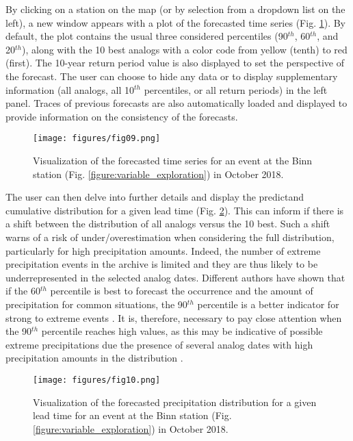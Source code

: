 \documentclass[review]{elsarticle}
\begin{document}
By clicking on a station on the map (or by selection from a dropdown list on the left), a new window appears with a plot of the forecasted time series (Fig. \ref{figure:atmoswing-viewer-timeseries}). By default, the plot contains the usual three considered percentiles (90$^{th}$, 60$^{th}$, and 20$^{th}$), along with the 10 best analogs with a color code from yellow (tenth) to red (first). The 10-year return period value is also displayed to set the perspective of the forecast. The user can choose to hide any data or to display supplementary information (all analogs, all 10$^{th}$ percentiles, or all return periods) in the left panel. Traces of previous forecasts are also automatically loaded and displayed to provide information on the consistency of the forecasts. 

\begin{figure}[hbt!]
	\texttt{[image: figures/fig09.png]}
	\caption{Visualization of the forecasted time series for an event at the Binn station (Fig. \ref{figure:variable_exploration}) in October 2018.}
	\label{figure:atmoswing-viewer-timeseries}
\end{figure}

The user can then delve into further details and display the predictand cumulative distribution for a given lead time (Fig. \ref{figure:atmoswing-viewer-distribution}). This can inform if there is a shift between the distribution of all analogs versus the 10 best. Such a shift warns of a risk of under/overestimation when considering the full distribution, particularly for high precipitation amounts. Indeed, the number of extreme precipitation events in the archive is limited and they are thus likely to be underrepresented in the selected analog dates. Different authors have shown that if the 60$^{th}$ percentile is best to forecast the occurrence and the amount of precipitation for common situations, the 90$^{th}$ percentile is a better indicator for strong to extreme events \citep{Djerboua2001, Bontron2004, Marty2010}. It is, therefore, necessary to pay close attention when the 90$^{th}$ percentile reaches high values, as this may be indicative of possible extreme precipitations due the presence of several analog dates with high precipitation amounts in the distribution \citep{Djerboua2001}.

\begin{figure}[hbt!]
	\texttt{[image: figures/fig10.png]}
	\caption{Visualization of the forecasted precipitation distribution for a given lead time for an event at the Binn station (Fig. \ref{figure:variable_exploration}) in October 2018.}
	\label{figure:atmoswing-viewer-distribution}
\end{figure}
\end{document}
